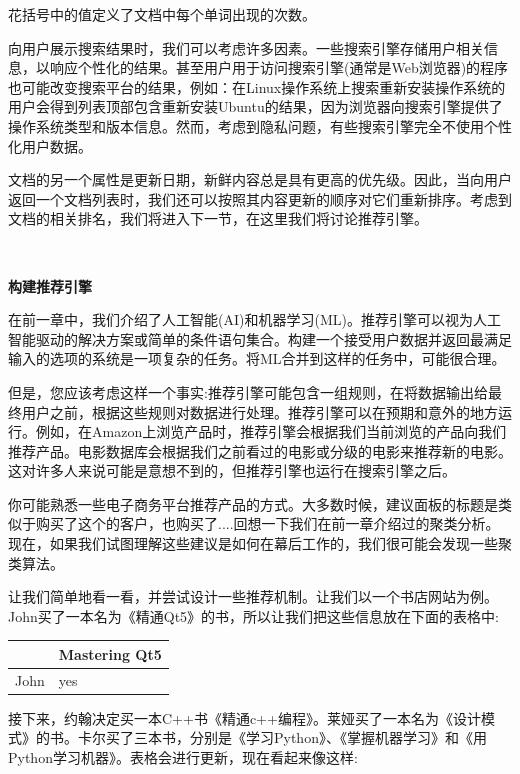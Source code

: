 花括号中的值定义了文档中每个单词出现的次数。 \par
向用户展示搜索结果时，我们可以考虑许多因素。一些搜索引擎存储用户相关信息，以响应个性化的结果。甚至用户用于访问搜索引擎(通常是Web浏览器)的程序也可能改变搜索平台的结果，例如：在Linux操作系统上搜索重新安装操作系统的用户会得到列表顶部包含重新安装Ubuntu的结果，因为浏览器向搜索引擎提供了操作系统类型和版本信息。然而，考虑到隐私问题，有些搜索引擎完全不使用个性化用户数据。 \par
文档的另一个属性是更新日期，新鲜内容总是具有更高的优先级。因此，当向用户返回一个文档列表时，我们还可以按照其内容更新的顺序对它们重新排序。考虑到文档的相关排名，我们将进入下一节，在这里我们将讨论推荐引擎。 \par

\noindent\textbf{}\ \par
\textbf{构建推荐引擎} \ \par
在前一章中，我们介绍了人工智能(AI)和机器学习(ML)。推荐引擎可以视为人工智能驱动的解决方案或简单的条件语句集合。构建一个接受用户数据并返回最满足输入的选项的系统是一项复杂的任务。将ML合并到这样的任务中，可能很合理。 \par
但是，您应该考虑这样一个事实:推荐引擎可能包含一组规则，在将数据输出给最终用户之前，根据这些规则对数据进行处理。推荐引擎可以在预期和意外的地方运行。例如，在Amazon上浏览产品时，推荐引擎会根据我们当前浏览的产品向我们推荐产品。电影数据库会根据我们之前看过的电影或分级的电影来推荐新的电影。这对许多人来说可能是意想不到的，但推荐引擎也运行在搜索引擎之后。 \par
你可能熟悉一些电子商务平台推荐产品的方式。大多数时候，建议面板的标题是类似于购买了这个的客户，也购买了....回想一下我们在前一章介绍过的聚类分析。现在，如果我们试图理解这些建议是如何在幕后工作的，我们很可能会发现一些聚类算法。 \par
让我们简单地看一看，并尝试设计一些推荐机制。让我们以一个书店网站为例。John买了一本名为《精通Qt5》的书，所以让我们把这些信息放在下面的表格中: \par

\begin{table}[h]
	\begin{tabularx}{\textwidth}{|X|X|}
		\hline
		 & Mastering Qt5 \\
		\hline
		John & yes \\
		\hline
	\end{tabularx}
\end{table}

接下来，约翰决定买一本C++书《精通c++编程》。莱娅买了一本名为《设计模式》的书。卡尔买了三本书，分别是《学习Python》、《掌握机器学习》和《用Python学习机器》。表格会进行更新，现在看起来像这样: \par

